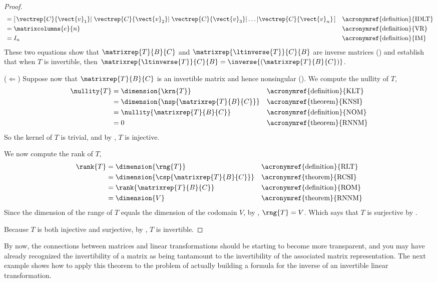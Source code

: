 \begin{proof}
\begin{align*}
%
&=\left[
\left.\vectrep{C}{\vect{v}_1}\right|
\left.\vectrep{C}{\vect{v}_2}\right|
\left.\vectrep{C}{\vect{v}_3}\right|
\ldots
\left|\vectrep{C}{\vect{v}_n}\right.
\right]&&\text{\acronymref{definition}{IDLT}}\\
%
&=\matrixcolumns{e}{n}
&&\text{\acronymref{definition}{VR}}\\
%
&=I_n
&&\text{\acronymref{definition}{IM}}
%
\end{align*}
%
These two equations show that $\matrixrep{T}{B}{C}$ and $\matrixrep{\ltinverse{T}}{C}{B}$ are inverse matrices () and establish that when $T$ is invertible, then $\matrixrep{\ltinverse{T}}{C}{B}=\inverse{\left(\matrixrep{T}{B}{C}\right)}$.\par
%
($\Leftarrow$)
Suppose now that $\matrixrep{T}{B}{C}$ is an invertible matrix and hence nonsingular ().  We compute the nullity of $T$,
%
\begin{align*}
\nullity{T}
&=\dimension{\krn{T}}
&&\text{\acronymref{definition}{KLT}}\\
%
&=\dimension{\nsp{\matrixrep{T}{B}{C}}}
&&\text{\acronymref{theorem}{KNSI}}\\
%
&=\nullity{\matrixrep{T}{B}{C}}
&&\text{\acronymref{definition}{NOM}}\\
%
&=0
&&\text{\acronymref{theorem}{RNNM}}
%
\end{align*}
%
So the kernel of $T$ is trivial, and by , $T$ is injective.\par
%
We now compute the rank of $T$,
%
\begin{align*}
\rank{T}
&=\dimension{\rng{T}}
&&\text{\acronymref{definition}{RLT}}\\
%
&=\dimension{\csp{\matrixrep{T}{B}{C}}}
&&\text{\acronymref{theorem}{RCSI}}\\
%
&=\rank{\matrixrep{T}{B}{C}}
&&\text{\acronymref{definition}{ROM}}\\
%
&=\dimension{V}
&&\text{\acronymref{theorem}{RNNM}}
%
\end{align*}
%
Since the dimension of the range of $T$ equals the dimension of the codomain $V$, by , $\rng{T}=V$.  Which says that $T$ is surjective by .\par
%
Because $T$ is both injective and surjective, by , $T$ is invertible.
%
\end{proof}
%
By now, the connections between matrices and linear transformations should be starting to become more transparent, and you may have already recognized the invertibility of a matrix as being  tantamount to the invertibility of the associated matrix representation.  The next example shows how to apply this theorem to the problem of actually building a formula for the inverse of an invertible linear transformation.
